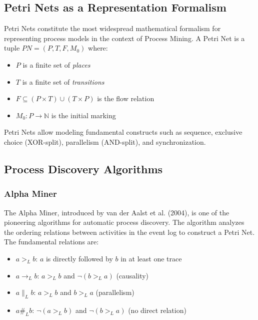 \documentclass[a4paper,twoside,12pt]{article}
\begin{document}
\subsection{Petri Nets as a Representation Formalism}

Petri Nets constitute the most widespread mathematical formalism for representing process models in the context of Process Mining. A Petri Net is a tuple $PN = (P, T, F, M_0)$ where:

\begin{itemize}
    \item $P$ is a finite set of \textit{places}
    \item $T$ is a finite set of \textit{transitions}
    \item $F \subseteq (P \times T) \cup (T \times P)$ is the flow relation
    \item $M_0: P \rightarrow \mathbb{N}$ is the initial marking
\end{itemize}

Petri Nets allow modeling fundamental constructs such as sequence, exclusive choice (XOR-split), parallelism (AND-split), and synchronization.

\subsection{Process Discovery Algorithms}

\subsubsection{Alpha Miner}

The Alpha Miner, introduced by van der Aalst et al. (2004), is one of the pioneering algorithms for automatic process discovery. The algorithm analyzes the ordering relations between activities in the event log to construct a Petri Net. The fundamental relations are:

\begin{itemize}
    \item $a >_L b$: $a$ is directly followed by $b$ in at least one trace
    \item $a \rightarrow_L b$: $a >_L b$ and $\neg(b >_L a)$ (causality)
    \item $a \parallel_L b$: $a >_L b$ and $b >_L a$ (parallelism)
    \item $a \#_L b$: $\neg(a >_L b)$ and $\neg(b >_L a)$ (no direct relation)
\end{itemize}
\end{document}
